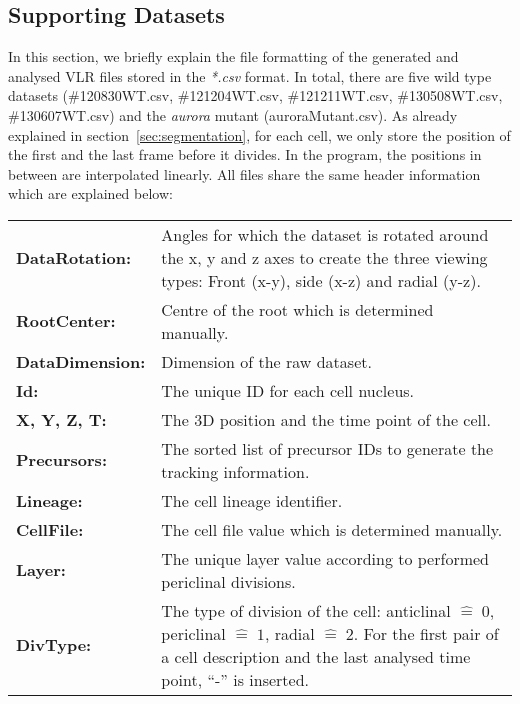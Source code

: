 \documentclass[11pt,a4paper, final]{article}
\begin{document}
\subsection{Supporting Datasets}
\label{sec:datasets}
\noindent
In this section, we briefly explain the file formatting of the generated and analysed VLR files stored in the \textit{*.csv} format. In total, there are five wild type datasets (\#120830WT.csv, \#121204WT.csv, \#121211WT.csv, \#130508WT.csv, \#130607WT.csv) and the \emph{aurora} mutant (auroraMutant.csv). As already explained in section~\ref{sec:segmentation}, for each cell, we only store the position of the first and the last frame before it divides. In the program, the positions in between are interpolated linearly. All files share the same header information which are explained below:

\noindent
\begin{tabularx}{\textwidth}{@{} >{\RaggedRight}p{2.8cm} X @{}}
\textbf{DataRotation:} &
Angles for which the dataset is rotated around the x, y and z axes to create the three viewing types: Front (x-y), side (x-z) and radial (y-z).\\
\textbf{RootCenter:} &
Centre of the root which is determined manually.\\
\textbf{DataDimension:} &
Dimension of the raw dataset.\\
\textbf{Id:} &
The unique ID for each cell nucleus.\\
\textbf{X, Y, Z, T:} &
The 3D position and the time point of the cell.\\
\textbf{Precursors:} &
The sorted list of precursor IDs to generate the tracking information.\\
\textbf{Lineage:} &
The cell lineage identifier.\\
\textbf{CellFile:} &
The cell file value which is determined manually.\\
\textbf{Layer:} &
The unique layer value according to performed periclinal divisions.\\
\textbf{DivType:} &
The type of division of the cell: anticlinal $\widehat{=} \; 0$, periclinal $\widehat{=} \; 1$, radial $\widehat{=} \; 2$. For the first pair of a cell description and the last analysed time point, ``-'' is inserted.\\
\end{tabularx}

\clearpage



\end{document}
